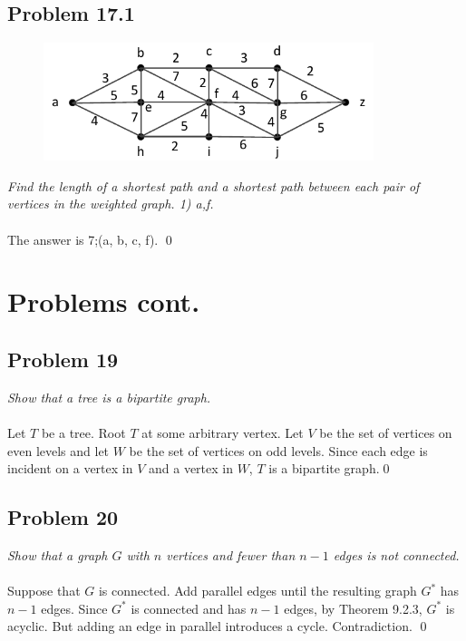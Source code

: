 \documentclass[
        ]{beamer}
\begin{document}
    \subsection{Problem 17.1}
        \begin{frame}[c]{\subsecname}
            \begin{figure}
                \centering
                \includegraphics[width=96.3mm]{tut11p17_1}
            \end{figure}
            \emph{Find the length of a shortest path and a shortest path between each pair of
vertices in the weighted graph. 1) a,f.}\\$\;$\\\pause
            The answer is 7;(a, b, c, f). \qed
        \end{frame}


\section{Problems cont.}
    \subsection{Problem 19}
        \begin{frame}[c]{\subsecname}
            \emph{Show that a tree is a bipartite graph.}\\$\;$\\\pause
            Let $T$ be a tree. Root $T$ at some arbitrary vertex. Let $V$ be the set of vertices on even levels and let $W$ be the set of vertices on odd levels. Since each edge is incident on a vertex in $V$ and a vertex in $W$, $T$ is a bipartite graph.\qed
        \end{frame}



    \subsection{Problem 20}
        \begin{frame}[c]{\subsecname}
            \emph{Show that a graph $G$ with $n$ vertices and fewer than $n-1$ edges is not connected.}\\$\;$\\\pause
            Suppose that $G$ is connected. Add parallel edges until the resulting graph $G^*$ has $n-1$ edges. Since $G^*$ is connected and has $n-1$ edges, by Theorem 9.2.3, $G^*$ is acyclic. But adding an edge in parallel introduces a cycle. Contradiction. \qed
        \end{frame}
\end{document}

